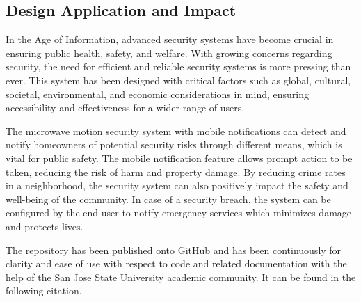 \subsection{Design Application and Impact}\label{subsec:design-application-and-impact}

In the Age of Information, advanced security systems have become crucial in ensuring public
health, safety, and welfare. With growing concerns regarding security, the need for
efficient and reliable security systems is more pressing than ever. This system has been designed
with critical factors such as global, cultural, societal, environmental, and economic
considerations in mind, ensuring accessibility and effectiveness for a wider range of users.

The microwave motion security system with mobile notifications can detect and notify homeowners
of potential security risks through different means, which is vital for public safety.
The mobile notification feature allows prompt action to be taken, reducing the risk of
harm and property damage. By reducing crime rates in a neighborhood, the security system
can also positively impact the safety and well-being of the community. In case of a
security breach, the system can be configured by the end user to notify emergency services which
minimizes damage and protects lives.

The repository has been published onto GitHub and has been continuously for clarity and ease of
use with respect to code and related documentation with the help of the San Jose State
University academic community. It can be found in the following citation. \cite{MorteSense-2023}